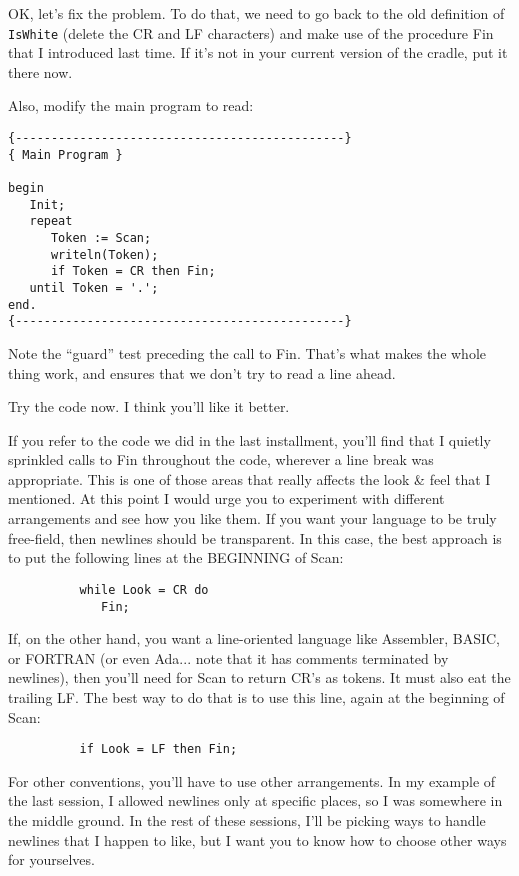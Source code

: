 OK, let's fix the problem. To do that, we need to go back to the old definition of {\tt IsWhite} (delete the CR and  LF  characters) and make  use  of  the procedure Fin that I introduced last time. If it's not in your current version of the cradle, put it there now.

Also, modify the main program to read:

\begin{verbatim}
{----------------------------------------------}
{ Main Program }

begin
   Init;
   repeat
      Token := Scan;
      writeln(Token);
      if Token = CR then Fin;
   until Token = '.';
end.
{----------------------------------------------}
\end{verbatim}

Note the ``guard''  test  preceding  the  call to Fin. That's what makes the whole thing work, and ensures that we don't try to read a line ahead.

Try the code now. I think you'll like it better.

If you refer to the code  we  did in the last installment, you'll find that I quietly sprinkled calls to Fin  throughout  the code, wherever  a line break was appropriate. This  is  one  of  those areas that really affects the look  \&  feel that I mentioned. At this  point  I  would  urge  you  to  experiment  with  different arrangements  and  see  how  you  like  them. If you want your language  to  be  truly  free-field, then  newlines   should  be transparent. In  this  case, the  best  approach is to put the following lines at the BEGINNING of Scan:

\begin{verbatim}
          while Look = CR do
             Fin;
\end{verbatim}

If, on the other  hand, you  want  a line-oriented language like Assembler, BASIC, or FORTRAN  (or  even  Ada... note that it has comments terminated by newlines), then  you'll  need for Scan to return CR's as tokens. It  must  also  eat the trailing LF. The best way to do that is to use this line, again  at the beginning of Scan:

\begin{verbatim}
          if Look = LF then Fin;
\end{verbatim}

For other conventions, you'll  have  to  use  other arrangements. In my example  of  the  last  session, I allowed newlines only at specific places, so I was somewhere in the middle ground. In the rest of these sessions, I'll be picking ways  to  handle newlines that I happen to like, but I want you to know how to choose other ways for yourselves.

